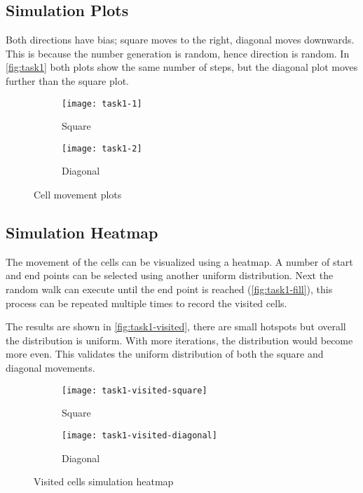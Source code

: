 \subsection{Simulation Plots}

Both directions have bias; square moves to the right, diagonal moves downwards.
This is because the number generation is random, hence direction is random.
In \autoref{fig:task1} both plots show the same number of steps, but the diagonal plot moves further than the square plot.

\begin{figure}[!ht]
    \centering
    \begin{subfigure}{0.4\textwidth}
    	\texttt{[image: task1-1]}
    	\caption[Square]{Square}
    	\label{fig:task1-1}
    \end{subfigure}
    \begin{subfigure}{0.4\textwidth}
    	\texttt{[image: task1-2]}
    	\caption[Diagonal]{Diagonal}
    	\label{fig:task1-2}
	\end{subfigure}
	\caption[Cell movement plots]{Cell movement plots}
    \label{fig:task1}
\end{figure}

\clearpage

\subsection{Simulation Heatmap}

The movement of the cells can be visualized using a heatmap.
A number of start and end points can be selected using another uniform distribution.
Next the random walk can execute until the end point is reached (\autoref{fig:task1-fill}),
this process can be repeated multiple times to record the visited cells.


The results are shown in \autoref{fig:task1-visited}, there are small hotspots but overall the distribution is uniform.
With more iterations, the distribution would become more even.
This validates the uniform distribution of both the square and diagonal movements.

\begin{figure}[ht]
    \centering
    \begin{subfigure}{0.45\textwidth}
        \texttt{[image: task1-visited-square]}
        \caption[Square]{Square}
        \label{fig:task1-visited-square}
    \end{subfigure}
    \begin{subfigure}{0.45\textwidth}
        \texttt{[image: task1-visited-diagonal]}
        \caption[Diagonal]{Diagonal}
        \label{fig:task1-visited-diagonal}
    \end{subfigure}
    \caption[Visited cells simulation heatmap]{Visited cells simulation heatmap}
    \label{fig:task1-visited}
\end{figure}

